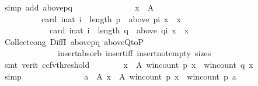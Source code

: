 \begin{isabellebody}
\ {\isacharparenleft}{\kern0pt}simp\ add{\isacharcolon}{\kern0pt}\ above{\isacharunderscore}{\kern0pt}pq{\isacharparenright}{\kern0pt}\isanewline
\ \ \ \ \ \ \isamarkupfalse%
\isanewline
\ \ \ \ \ \ \ \ {\isachardoublequoteopen}{\isasymforall}x\ {\isasymin}\ A{\isachardot}{\kern0pt}\isanewline
\ \ \ \ \ \ \ \ \ \ card\ {\isacharbraceleft}{\kern0pt}i{\isacharcolon}{\kern0pt}{\isacharcolon}{\kern0pt}nat{\isachardot}{\kern0pt}\ i\ {\isacharless}{\kern0pt}\ length\ p\ {\isasymand}\ above\ {\isacharparenleft}{\kern0pt}p{\isacharbang}{\kern0pt}i{\isacharparenright}{\kern0pt}\ x\ {\isacharequal}{\kern0pt}\ {\isacharbraceleft}{\kern0pt}x{\isacharbraceright}{\kern0pt}{\isacharbraceright}{\kern0pt}\ {\isacharequal}{\kern0pt}\isanewline
\ \ \ \ \ \ \ \ \ \ \ \ card\ {\isacharbraceleft}{\kern0pt}i{\isacharcolon}{\kern0pt}{\isacharcolon}{\kern0pt}nat{\isachardot}{\kern0pt}\ i\ {\isacharless}{\kern0pt}\ length\ q\ {\isasymand}\ above\ {\isacharparenleft}{\kern0pt}q{\isacharbang}{\kern0pt}i{\isacharparenright}{\kern0pt}\ x\ {\isacharequal}{\kern0pt}\ {\isacharbraceleft}{\kern0pt}x{\isacharbraceright}{\kern0pt}{\isacharbraceright}{\kern0pt}{\isachardoublequoteclose}\isanewline
\ \ \ \ \ \ \ \ \isamarkupfalse%
\ Collect{\isacharunderscore}{\kern0pt}cong\ DiffI\ above{\isacharunderscore}{\kern0pt}pq\ above{\isacharunderscore}{\kern0pt}QtoP\isanewline
\ \ \ \ \ \ \ \ \ \ \ \ \ \ insert{\isacharunderscore}{\kern0pt}absorb\ insert{\isacharunderscore}{\kern0pt}iff\ insert{\isacharunderscore}{\kern0pt}not{\isacharunderscore}{\kern0pt}empty\ sizes\isanewline
\ \ \ \ \ \ \ \ \isamarkupfalse%
\ {\isacharparenleft}{\kern0pt}smt\ {\isacharparenleft}{\kern0pt}verit{\isacharcomma}{\kern0pt}\ ccfv{\isacharunderscore}{\kern0pt}threshold{\isacharparenright}{\kern0pt}{\isacharparenright}{\kern0pt}\isanewline
\ \ \ \ \ \ \isamarkupfalse%
\ {\isachardoublequoteopen}{\isasymforall}x\ {\isasymin}\ A{\isachardot}{\kern0pt}\ win{\isacharunderscore}{\kern0pt}count\ p\ x\ {\isacharequal}{\kern0pt}\ win{\isacharunderscore}{\kern0pt}count\ q\ x{\isachardoublequoteclose}\isanewline
\ \ \ \ \ \ \ \ \isamarkupfalse%
\ simp\isanewline
\ \ \ \ \ \ \isamarkupfalse%
\isanewline
\ \ \ \ \ \ \ \ {\isachardoublequoteopen}{\isacharbraceleft}{\kern0pt}a\ {\isasymin}\ A{\isachardot}{\kern0pt}\ {\isasymforall}x\ {\isasymin}\ A{\isachardot}{\kern0pt}\ win{\isacharunderscore}{\kern0pt}count\ p\ x\ {\isasymle}\ win{\isacharunderscore}{\kern0pt}count\ p\ a{\isacharbraceright}{\kern0pt}\ {\isacharequal}{\kern0pt}\isanewline

\end{isabellebody}
